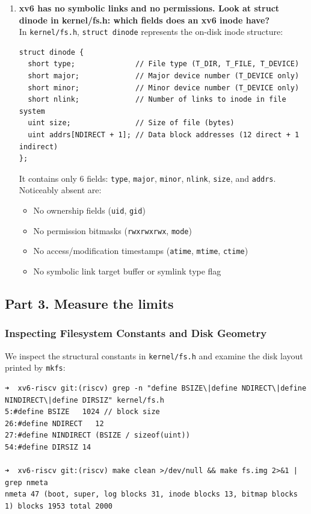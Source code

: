 \documentclass{labreport}
\begin{document}
\begin{enumerate}[leftmargin=*]
    \item \textbf{xv6 has no symbolic links and no permissions. Look at struct dinode in kernel/fs.h: which fields does an xv6 inode have?}\\[0.2em]
    In \texttt{kernel/fs.h}, \texttt{struct dinode} represents the on-disk inode structure:
\begin{lstlisting}[style=c]
struct dinode {
  short type;              // File type (T_DIR, T_FILE, T_DEVICE)
  short major;             // Major device number (T_DEVICE only)
  short minor;             // Minor device number (T_DEVICE only)
  short nlink;             // Number of links to inode in file system
  uint size;               // Size of file (bytes)
  uint addrs[NDIRECT + 1]; // Data block addresses (12 direct + 1 indirect)
};
\end{lstlisting}
    It contains only 6 fields: \texttt{type}, \texttt{major}, \texttt{minor}, \texttt{nlink}, \texttt{size}, and \texttt{addrs}.\\
    Noticeably absent are:
    \begin{itemize}[noitemsep]
        \item No ownership fields (\texttt{uid}, \texttt{gid})
        \item No permission bitmasks (\texttt{rwxrwxrwx}, \texttt{mode})
        \item No access/modification timestamps (\texttt{atime}, \texttt{mtime}, \texttt{ctime})
        \item No symbolic link target buffer or symlink type flag
    \end{itemize}
\end{enumerate}

\subsection{Part 3. Measure the limits}

\subsubsection{Inspecting Filesystem Constants and Disk Geometry}
We inspect the structural constants in \texttt{kernel/fs.h} and examine the disk layout printed by \texttt{mkfs}:

\begin{lstlisting}[style=bash]
➜  xv6-riscv git:(riscv) grep -n "define BSIZE\|define NDIRECT\|define NINDIRECT\|define DIRSIZ" kernel/fs.h
5:#define BSIZE   1024 // block size
26:#define NDIRECT   12
27:#define NINDIRECT (BSIZE / sizeof(uint))
54:#define DIRSIZ 14

➜  xv6-riscv git:(riscv) make clean >/dev/null && make fs.img 2>&1 | grep nmeta
nmeta 47 (boot, super, log blocks 31, inode blocks 13, bitmap blocks 1) blocks 1953 total 2000
\end{lstlisting}
\end{document}
